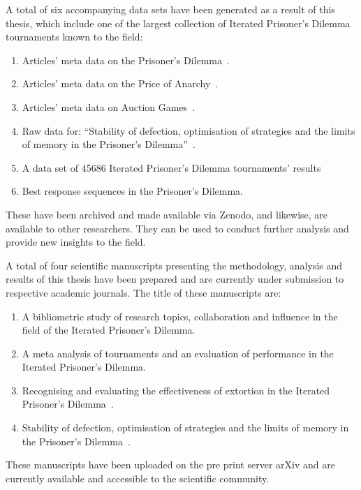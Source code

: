 A total of six accompanying data sets have been generated as a result of this thesis,
which include one of the largest collection of Iterated Prisoner's Dilemma
tournaments known to the field:

\begin{enumerate}
    \item Articles' meta data on the Prisoner's Dilemma~\cite{pd_data_2018}.
    \item Articles' meta data on the Price of Anarchy~\cite{anarchy_data_2018}.
    \item Articles' meta data on Auction Games~\cite{auction_data_2018}.
    \item Raw data for: ``Stability of defection, optimisation of strategies and
    the limits of memory in the Prisoner's Dilemma''~\cite{glynatsi2019}.
    \item A data set of 45686 Iterated Prisoner's Dilemma tournaments' results~\cite{data} %
    \item Best response sequences in the Prisoner's Dilemma. %
\end{enumerate}

These have been archived and made available via Zenodo, and likewise, are
available to other researchers. They can be used to conduct further analysis and
provide new insights to the field.

A total of four scientific manuscripts presenting the methodology, analysis and
results of this thesis have been prepared and are currently under submission to
respective academic journals. The title of these manuscripts are:

\begin{enumerate}
    \item A bibliometric study of research topics, collaboration and influence
    in the field of the Iterated Prisoner's Dilemma.
    \item A meta analysis of tournaments and an evaluation of performance in the
    Iterated Prisoner's Dilemma.
    \item Recognising and evaluating the effectiveness of extortion in the
    Iterated Prisoner's Dilemma~\cite{Knight2019}.
    \item Stability of defection, optimisation of strategies and the limits of
    memory in the Prisoner's Dilemma~\cite{glynatsi2019}.
\end{enumerate} %

These manuscripts have been uploaded on the pre
print server arXiv and are currently available and accessible to the scientific
community.

